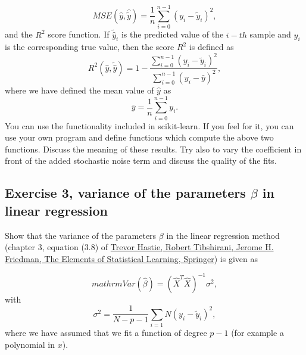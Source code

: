 \documentclass[%
oneside,                 %
final,                   %
10pt]{article}
\begin{document}
\noindent
\[ MSE(\hat{y},\hat{\tilde{y}}) = \frac{1}{n}
\sum_{i=0}^{n-1}(y_i-\tilde{y}_i)^2, 
\] 
and the $R^2$ score function.
If $\tilde{\hat{y}}_i$ is the predicted value of the $i-th$ sample and $y_i$ is the corresponding true value, then the score $R^2$ is defined as
\[
R^2(\hat{y}, \tilde{\hat{y}}) = 1 - \frac{\sum_{i=0}^{n - 1} (y_i - \tilde{y}_i)^2}{\sum_{i=0}^{n - 1} (y_i - \bar{y})^2},
\]
where we have defined the mean value  of $\hat{y}$ as
\[
\bar{y} =  \frac{1}{n} \sum_{i=0}^{n - 1} y_i.
\]
You can use the functionality included in scikit-learn. If you feel for it, you can use your own program and define functions which compute the above two functions. 
Discuss the meaning of these results. Try also to vary the coefficient in front of the added stochastic noise term and discuss the quality of the fits.




\subsection{Exercise 3, variance of the parameters $\beta$ in linear regression}

Show that the variance of the parameters $\beta$ in the linear regression method (chapter 3, equation (3.8) of \href{{https://www.springer.com/gp/book/9780387848570}}{Trevor Hastie, Robert Tibshirani, Jerome H. Friedman, The Elements of Statistical Learning, Springer}) is given as 

\[
mathrm{Var}(\hat{\beta}) = \left(\hat{X}^T\hat{X}\right)^{-1}\sigma^2,
\]
with 
\[
\sigma^2 = \frac{1}{N-p-1}\sum_{i=1}{N} (y_i-\tilde{y}_i)^2,
\]
where we have assumed that we fit a function of degree $p-1$ (for example a polynomial in $x$). 



\end{document}

